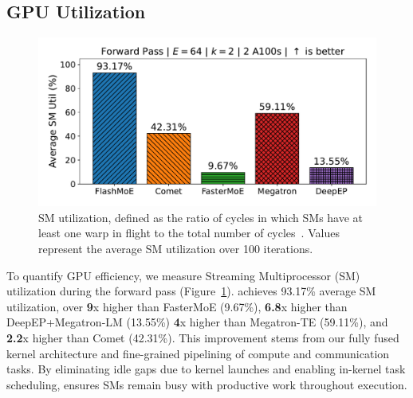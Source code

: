 \subsection{GPU Utilization}\label{subsec:gpu-utilization}
\begin{figure}
    \vspace{-10pt}
    \centering
    \includegraphics[width=0.9\linewidth, keepaspectratio]{flash_figs/sm_util}
    \caption{SM utilization, defined as the ratio of cycles in which SMs
    have at least one warp in flight
    to the total number of cycles~\cite{nsight-metrics}.
    Values represent the average SM utilization over 100 iterations.}
    \label{fig:smu}
\end{figure}
To quantify GPU efficiency, we measure Streaming Multiprocessor (SM) utilization during the forward pass (Figure~\ref{fig:smu}).
\sysname achieves 93.17\% average SM utilization,
over \textbf{9}x higher than FasterMoE (9.67\%), \textbf{6.8}x higher than DeepEP+Megatron-LM (13.55\%)
\textbf{4}x higher than Megatron-TE (59.11\%), and
\textbf{2.2}x higher than Comet (42.31\%).
This improvement stems from our fully fused kernel architecture and
fine-grained pipelining of compute and communication tasks.
By eliminating idle gaps due to kernel launches and enabling in-kernel task scheduling,
\sysname ensures SMs remain busy with productive work throughout execution.
